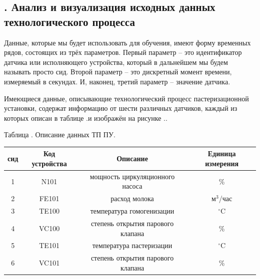 \setcounter{chaptercntr}{3}


\titlespace

\subsection*{ 
  \gostTitleFont
  \redline
  \thechaptercntr .\thesubchaptercntr \spc
  Анализ и визуализация исходных данных технологического процесса
} \addtocounter{subchaptercntr}{1}

\subtitlespace

{\gostFont

  \par \redline Данные, которые мы будет использовать для обучения, имеют форму временных рядов, состоящих из трёх параметров. Первый параметр {--} это идентификатор датчика или исполняющего устройства, который в дальнейшем мы будем называть просто сид. Второй параметр {--} это дискретный момент времени, измеряемый в секундах. И, наконец, третий параметр {--} значение датчика. 

  \par \redline Имеющиеся данные, описывающие технологический процесс пастеризационной установки, содержат информацию от шести различных датчиков, каждый из которых описан в таблице \thechaptercntr .\thetablecntr \spc и изображён на рисунке \thechaptercntr .\theimagecntr .

	\topTablespace
	{\begin{Center}
		\par Таблица \thechaptercntr .\thetablecntr \spc {--} Описание данных ТП ПУ.

	\begin{tabular}{|c|c|c|c|}
		\hline
	  сид & Код устройства & Описание & Единица измерения \\ \hline
		1 & N101 & мощность циркуляционного насоса & \% \\ \hline
		2 & FE101 & расход молока & м$^3$/час \\ \hline
		3 & TE100 & температура гомогенизации & $^\circ$C \\ \hline
		4 & VC100 & степень открытия парового клапана & \% \\ \hline
		5 & TE101 & температура пастеризации & $^\circ$C \\ \hline
		6 & VC101 & степень открытия парового клапана & \% \\ \hline
	\end{tabular} \end{Center}} 
	\botTablespace

}

